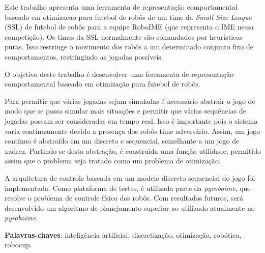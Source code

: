 \setlength{\absparsep}{18pt} %
\begin{resumo}

  Este trabalho apresenta uma ferramenta de representação comportamental baseado
  em otimizacao para futebol de robôs de um time da \textit{Small
  Size League} (SSL) de futebol de robôs para a equipe RoboIME (que representa o
  IME nessa competição). Os times da SSL normalmente são comandados por
  heurísticas puras. Isso restringe o movimento dos robôs a um determinado
  conjunto fixo de comportamentos, restringindo as jogadas possíveis.

  O objetivo deste trabalho é desenvolver uma ferramenta de representação
  comportamental baseado em otimização para futebol de robôs.

  Para permitir que várias jogadas sejam simuladas é necessário abstrair
  o jogo de modo que se possa simular mais situações e permitir que várias
  sequências de jogadas possam ser consideradas em tempo real. Isso é importante
  pois o sistema varia continuamente devido a presença dos robôs time adversário.
  Assim, um jogo contínuo é abstraído em um discreto e sequencial,
  semelhante a um jogo de xadrez. Partindo-se desta abstração, é construida
  uma função utilidade, permitido assim que o problema seja tratado como um problema
  de otimização.

  A arquitetura de controle baseada em um modelo discreto sequencial do jogo foi
  implementada. Como plataforma de testes, é utilizada parte da \textit{pyroboime}, que
  resolve o problema de controle físico dos robôs. Com resultados futuros, será
  desenvolvido um algoritmo de planejamento superior ao utilizado atualmente no
  \textit{pyroboime}.

  \textbf{Palavras-chaves}: inteligência artificial, discretização, otimização, robótica, robocup.
\end{resumo}

